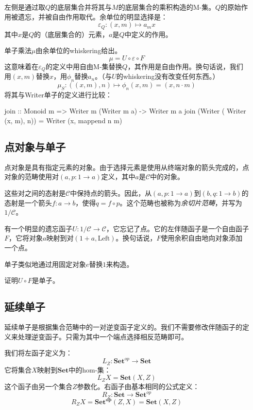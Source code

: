 \documentclass[DaoFP]{subfiles}
\begin{document}
左侧是通过取$Q$的底层集合并将其与$M$的底层集合的乘积构造的M-集。$Q$的原始作用被遗忘，并被自由作用取代。余单位的明显选择是：
\[ \varepsilon_Q \colon (x, m) \mapsto a_m x \]
其中$x$是$Q$的（底层集合的）元素，$a$是$Q$中定义的作用。

单子乘法$\mu$由余单位的whiskering给出。
\[ \mu = U \circ \varepsilon \circ F \]
这意味着在$\varepsilon_Q$的定义中用自由M-集替换$Q$，其作用是自由作用。换句话说，我们用$(x, m)$替换$x$，用$\phi_n$替换$a_n$。（与$U$的whiskering没有改变任何东西。）
\[ \mu_S \colon ((x, m), n) \mapsto \phi_n (x, m) = (x, n \cdot m) \]
将其与Writer单子的定义进行比较：
\begin{haskell}
join :: Monoid m => Writer m (Writer m a) -> Writer m a
join (Writer ( Writer (x, m), n)) = Writer (x, mappend n m)
\end{haskell}

\subsection{点对象与单子}

点对象是具有指定元素的对象。由于选择元素是使用从终端对象的箭头完成的，点对象的范畴使用对$(a, p \colon 1 \to a)$定义，其中$a$是$\mathcal{C}$中的对象。

这些对之间的态射是$\mathcal{C}$中保持点的箭头。因此，从$(a, p \colon 1 \to a)$到$(b, q \colon 1 \to b)$的态射是一个箭头$f \colon a \to b$，使得$q = f \circ p$。这个范畴也被称为\emph{余切片范畴}，并写为$1/\mathcal{C}$。

有一个明显的遗忘函子$U \colon 1/\mathcal{C} \to \mathcal{C}$，它忘记了点。它的左伴随函子是一个自由函子$F$，它将对象$a$映射到对$(1 + a, \text{Left})$。换句话说，$F$使用余积自由地向对象添加一个点。

单子类似地通过用固定对象$e$替换$1$来构造。

\begin{exercise}
证明$U \circ F$是单子。
\end{exercise}

\subsection{延续单子}

延续单子是根据集合范畴中的一对逆变函子定义的。我们不需要修改伴随函子的定义来处理逆变函子。只需为其中一个端点选择相反范畴即可。

我们将左函子定义为：
\[ L_Z \colon \mathbf{Set}^{op} \to \mathbf{Set} \] 
它将集合$X$映射到$\mathbf{Set}$中的hom-集：
\[ L_Z X = \mathbf{Set}(X, Z) \] 
这个函子由另一个集合$Z$参数化。右函子由基本相同的公式定义：
\[ R_Z \colon \mathbf{Set} \to \mathbf{Set}^{op} \] 
\[ R_Z X = \mathbf{Set^{op}}(Z, X)  = \mathbf{Set}(X, Z) \] 
\end{document}
